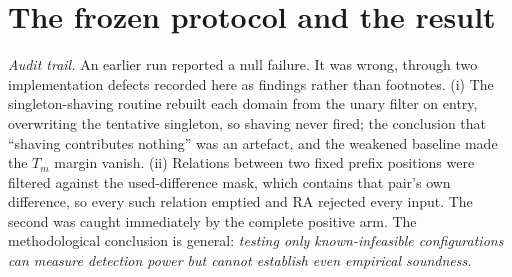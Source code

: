 \documentclass[11pt,a4paper,oneside]{report}
\theoremstyle{definition}
\begin{document}
\section{The frozen protocol and the result}
\emph{Audit trail.} An earlier run reported a null failure. It was wrong, through
two implementation defects recorded here as findings rather than footnotes. (i)
The singleton-shaving routine rebuilt each domain from the unary filter on entry,
overwriting the tentative singleton, so shaving never fired; the conclusion that
``shaving contributes nothing'' was an artefact, and the weakened baseline made
the $T_m$ margin vanish. (ii) Relations between two fixed prefix positions were
filtered against the used-difference mask, which contains that pair's own
difference, so every such relation emptied and RA rejected every input. The
second was caught immediately by the complete positive arm. The methodological
conclusion is general: \emph{testing only known-infeasible configurations can
measure detection power but cannot establish even empirical soundness.}
\end{document}
